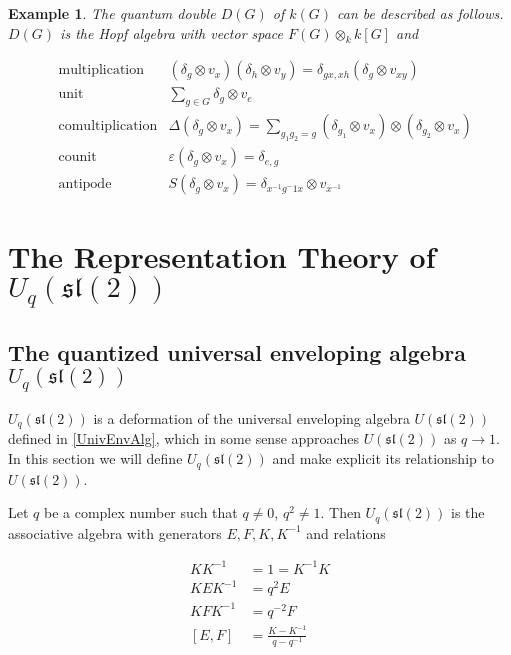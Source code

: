 \documentclass[]{article}
\newtheorem{example}[theorem]{Example}
\newcommand{\sll}{\mathfrak{sl}}
\numberwithin{equation}{subsection}
\begin{document}
\begin{example}
    The quantum double $D(G)$ of $k(G)$ can be described as follows. $D(G)$ is the Hopf algebra with vector space $F(G) \otimes_k k[G]$ and 

    \begin{align}
        &\text{multiplication} &(\delta_g\otimes v_x) (\delta_h \otimes v_y) = \delta_{gx,xh} (\delta_g \otimes v_{xy})\\
        &\text{unit}           &\sum_{g \in G} \delta_g  \otimes v_e\\
        &\text{comultiplication} &\Delta(\delta_g \otimes v_x) = \sum_{g_1 g_2 = g} (\delta_{g_1} \otimes v_x) \otimes (\delta_{g_2} \otimes v_x) \\
        &\text{counit}           &\varepsilon(\delta_g \otimes v_x) = \delta_{e,g} \\
        &\text{antipode}         &S(\delta_g \otimes v_x) = \delta_{x^{-1}g^-1 x} \otimes v_{x^{-1}}
    \end{align}


\end{example}


\section{The Representation Theory of $U_q(\sll(2))$}
\subsection{The quantized universal enveloping algebra $U_q(\sll(2))$}

$U_q(\sll(2))$ is a deformation of the universal enveloping algebra
$U(\sll(2))$ defined in \ref{UnivEnvAlg}, which in some sense approaches
$U(\sll(2))$ as $q \to 1$. In this section we will define $U_q(\sll(2))$ and
make explicit its relationship to $U(\sll(2))$.

Let $q$ be a complex number such that $q \neq 0$, $q^2 \neq 1$.  Then $U_q(\sll(2))$ is the associative algebra with generators $E,F,K, K^{-1}$ and relations 

\begin{align}
    KK^{-1} &= 1 = K^{-1}K \\
    KEK^{-1} &= q^2 E \\
    KFK^{-1} &= q^{-2} F \\
    [E,F] &= \frac{K - K^{-1}}{q - q^{-1}}
\end{align}


\end{document}
